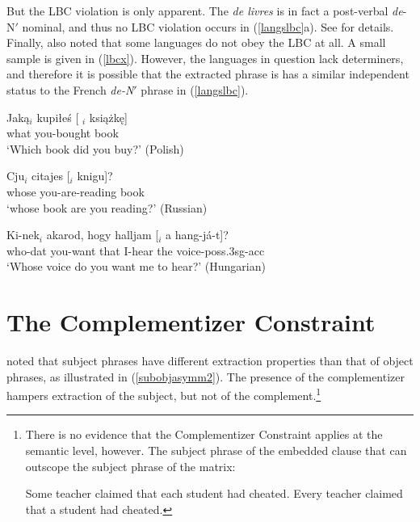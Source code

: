 \documentclass[output=paper
	        ,collection
	        ,collectionchapter
 	        ,biblatex
                ,babelshorthands
                ,newtxmath
                ,draftmode
                ,colorlinks, citecolor=brown
]{langscibook}
\begin{document}
 \zl \label{langslbc}


\noindent
But the LBC violation is only apparent. The {\it de livres} is in fact a post-verbal {\it de}-N$'$ nominal, and thus no LBC violation occurs  in (\ref{langslbc}a). See \citet{Abeille:Bonami:ea:04} for details.
Finally, \citet{Ross67} also  noted that some languages do not obey the LBC at all. A small sample is given in (\ref{lbcx}). However, the languages  in question lack determiners, and therefore it is possible that
the extracted phrase is has a similar independent status to the French {\it de-N}$'$ phrase in (\ref{langslbc}).
 
\ea
 \ea \gll Jak\k{a}$_i$  kupi\l{}e\'{s} { [ \spc$_i$ } ksi\k{a}\.{z}k\k{e}]\\
     what  you-bought  {} book\\
    \glt `Which book did you buy?' \hfill (Polish)
       
 \ex \gll Cju$_i$  citajes [\spc$_i$  knigu]?\\
 whose  you-are-reading {}  book\\
  \glt `whose book are you reading?' \hfill (Russian)
 
 \ex \gll Ki-nek$_i$  akarod,  hogy  halljam  {[\spc$_i$}  a  hang-j\'{a}-t]?\\
 who-{\sc dat}  you-want  that  I-hear {} the  voice-{\sc poss.3sg-acc}\\ 
\glt `Whose voice do you want me to hear?' \hfill (Hungarian)
 \z \label{lbcx}
 \z
 

 
 
 
\section{The Complementizer Constraint}

\citet{Perlmutter68} noted that subject phrases have different extraction properties than that of object phrases, as illustrated in (\ref{subobjasymm2}). The presence of the complementizer hampers extraction of the subject, but not of the complement.\footnote{There is no evidence that the Complementizer Constraint applies at the semantic level, however. The  subject phrase of the embedded clause that can outscope the subject phrase of  the matrix:

\eal
\ex Some teacher claimed that each student had cheated.
\ex Every teacher claimed that a student had cheated.
\zllast
} 
\end{document}
